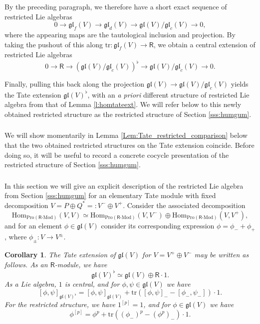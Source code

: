 \documentclass{amsart}
\newtheorem{Cor}[Thm]{Corollary}
\theoremstyle{definition}
\newcommand{\gl}{\mathfrak{gl}}
\newcommand{\Pro}{\on{Pro}}
\newcommand{\sss}{\subsubsection{}}
\newcommand{\Hom}{\on{Hom}}
\renewcommand{\mod}{\text{-}\on{Mod}}
\newcommand{\on}{\mathrm}
\newcommand{\Ring}{\mathsf{R}}
\numberwithin{equation}{section}
\begin{document}
 By the preceding paragraph, we therefore have a short exact sequence of restricted Lie algebras
$$0 \rightarrow \gl_f(V) \rightarrow \gl_d(V) \rightarrow \gl(V)/\gl_c(V) \rightarrow 0,$$where the appearing maps are the tautological inclusion and projection. By taking the pushout of this along $\on{tr}: \gl_f(V) \rightarrow \Ring$, we obtain a central extension of restricted Lie algebras
\begin{equation} 0 \rightarrow \Ring \rightarrow (\gl(V)/\gl_c(V))^\flat \rightarrow \gl(V)/\gl_c(V) \rightarrow 0.\label{e:tateasymp}\end{equation} 
{ Finally, pulling this back along the projection $\gl(V) \rightarrow \gl(V)/\gl_c(V)$ yields the Tate extension $\gl(V)^\flat$, with an {\em a priori} different structure of restricted Lie algebra from that of Lemma \ref{l:homtateext}. We will refer below to this newly obtained restricted structure as the restricted structure of Section \ref{sss:humgum}. 


\sss  We will show momentarily in Lemma \ref{Lem:Tate_restricted_comparison} below that the two obtained restricted structures on the Tate extension coincide. Before doing so, it will be useful to record a concrete cocycle presentation of the restricted structure of Section \ref{sss:humgum}. 


\sss In this section we will give an explicit description of the  restricted Lie algebra from Section \ref{sss:humgum} for an elementary Tate module with fixed decomposition $V = P \oplus Q^* =: V^- \oplus V^+$. Consider the associated decomposition $$\Hom_{\Pro(\Ring\mod)}(V,V) \simeq \Hom_{\Pro(\Ring\mod)}(V, V^-) \oplus \Hom_{\Pro(\Ring\mod)}(V, V^+),$$and for an element $\phi \in \gl(V)$ consider its corresponding expression $\phi = \phi_- + \phi_+$, where $\phi_{\pm}: V \rightarrow V^{\pm}.$ 

\begin{Cor}\label{c:Tateformula} The Tate extension of $\mathfrak{gl}(V)$ for $V = V^+ \oplus V^-$ may be written as follows. As an $\Ring$-module, we have 
$$\gl(V)^\flat \simeq \gl(V) \oplus \Ring \cdot 1.$$
As a Lie algebra, $1$ is central, and for $\phi, \psi \in \gl(V)$ we have 
$$[\phi, \psi]_{\gl(V)^\flat} =  [\phi, \psi]_{\gl(V)}  + \on{tr}( [\phi, \psi]_- - [\phi_-, \psi_-]) \cdot 1.$$For the restricted structure, we have $1^{[p]} = 1$, and for $\phi \in \gl(V)$ we have 
\begin{equation} \label{e:restrtate}\phi^{[p]} = \phi^p  + \on{tr}( (\phi_-)^p - (\phi^p)_-) \cdot 1.\end{equation}
\end{Cor}


}
\end{document}
